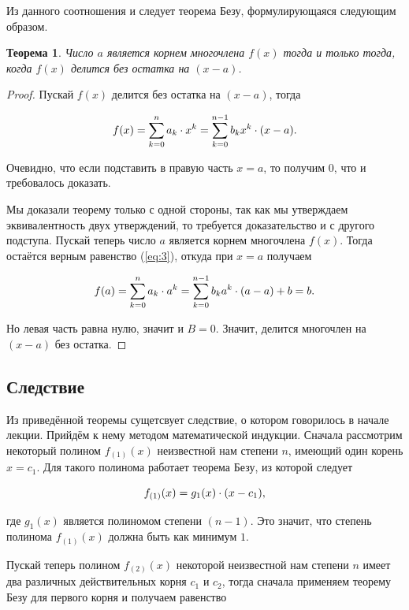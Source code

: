 \documentclass[12pt]{article}
\newtheorem{theorem}{Теорема}[section]
\begin{document}
Из данного соотношения и следует теорема Безу, формулирующаяся следующим образом.

\begin{theorem}
	Число $a$ является корнем многочлена $f(x)$ тогда и только тогда, когда $f(x)$ делится без остатка на $(x-a)$.
\end{theorem}

\begin{proof}
Пускай $f(x)$ делится без остатка на $(x-a)$, тогда 

\begin{equation}
f(x) = \sum_{k=0}^n{a_k \cdot x^k} = \sum_{k=0}^{n-1}{b_k x^k}\cdot \qty(x-a).
\end{equation}

Очевидно, что если подставить в правую часть $x=a$, то получим $0$, что и требовалось доказать. 

\par 
Мы доказали теорему только с одной стороны, так как мы утверждаем эквивалентность двух утверждений, то требуется доказательство и с другого подступа. Пускай теперь число $a$ является корнем многочлена $f(x)$. Тогда остаётся верным равенство (\ref{eq:3}), откуда при $x=a$ получаем

\begin{equation}
  f(a) = \sum_{k=0}^n{a_k \cdot a^k} = \sum_{k=0}^{n-1}{b_k a^k}\cdot \qty(a-a) + b = b.
\end{equation}

Но левая часть равна нулю, значит и $B = 0$. Значит, делится многочлен на $(x-a)$ без остатка.
\end{proof}

\subsection{Следствие}
Из приведённой теоремы сущетсвует следствие, о котором говорилось в начале лекции. Прийдём к нему методом математической индукции. Сначала рассмотрим некоторый полином $f_{(1)}(x)$ неизвестной нам степени $n$, имеющий один корень $x=c_1$. Для такого полинома работает теорема Безу, из которой следует

\begin{equation}
  f_{(1)}(x) = g_1(x)\cdot \qty(x-c_1),
\end{equation}

где $g_1(x)$ является полиномом степени $(n-1)$. Это значит, что степень полинома $f_{(1)}(x)$ должна быть как минимум $1$. 

\par 
Пускай теперь полином $f_{(2)}(x)$ некоторой неизвестной нам степени $n$ имеет два различных действительных корня $c_1$ и $c_2$, тогда сначала применяем теорему Безу для первого корня и получаем равенство
\end{document}
